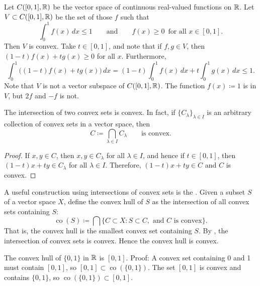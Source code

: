 \begin{example}
Let $C([0,1],{\mathbb{R}})$ be the vector space of continuous real-valued functions on ${\mathbb{R}}$.
Let $V \subset C([0,1],{\mathbb{R}})$ be the set of those $f$ such that
\begin{equation*}
\int_0^1 f(x)\,dx \leq 1 \qquad \text{and} \qquad
f(x) \geq 0 \enspace \text{for all } x \in [0,1] .
\end{equation*}
Then $V$ is convex.  Take $t \in [0,1]$, and note that if $f,g \in V$,
then $(1-t) f(x) + t g(x) \geq 0$ for all $x$.  Furthermore,
\begin{equation*}
\int_0^1 \bigl((1-t)f(x) + t g(x)\bigr) \,dx
=
(1-t) \int_0^1 f(x) \,dx
+ t \int_0^1 g(x) \,dx \leq 1 .
\end{equation*}
Note that $V$ is not a vector subspace of $C([0,1],{\mathbb{R}})$.  The function
$f(x) \coloneqq 1$ is in $V$, but $2f$ and $-f$ is not.
\end{example}

\begin{prop} \label{prop:intersectionconvex}
The intersection of two convex sets is convex.  In fact,
if $\{ C_\lambda \}_{\lambda \in I}$ is
an arbitrary collection of convex sets in a vector space, then
\begin{equation*}
C \coloneqq \bigcap_{\lambda \in I} C_\lambda
\qquad \text{is convex.}
\end{equation*}
\end{prop}

\begin{proof}
If $x, y \in C$, then $x,y \in C_\lambda$ for all
$\lambda \in I$, and hence if $t \in [0,1]$, then $(1-t)x + ty \in
C_\lambda$ for all $\lambda \in I$.  Therefore, $(1-t)x + ty \in C$ and $C$
is convex.
\end{proof}

A useful construction using intersections of convex sets is the
\emph{}.  Given a subset $S$ of a vector
space $X$, define the convex hull of $S$ as the intersection of all convex sets
containing $S$:
\begin{equation*}
\operatorname{co}(S) \coloneqq
\bigcap \{ C \subset X : S \subset C, \text{ and } C \text{ is convex} \} .
\end{equation*}
That is, the convex hull is the smallest convex set containing $S$.  
By , the intersection of convex sets is
convex.
Hence the convex hull is convex.

\begin{example}
The convex hull of $\{ 0, 1 \}$ in ${\mathbb{R}}$ is $[0,1]$.  Proof:
A convex set containing 0 and 1 must contain $[0,1]$, so
$[0,1] \subset \operatorname{co}(\{0,1\})$.
The set $[0,1]$ is convex and contains $\{0,1\}$, so
$\operatorname{co}(\{0,1\}) \subset [0,1]$.
\end{example}

